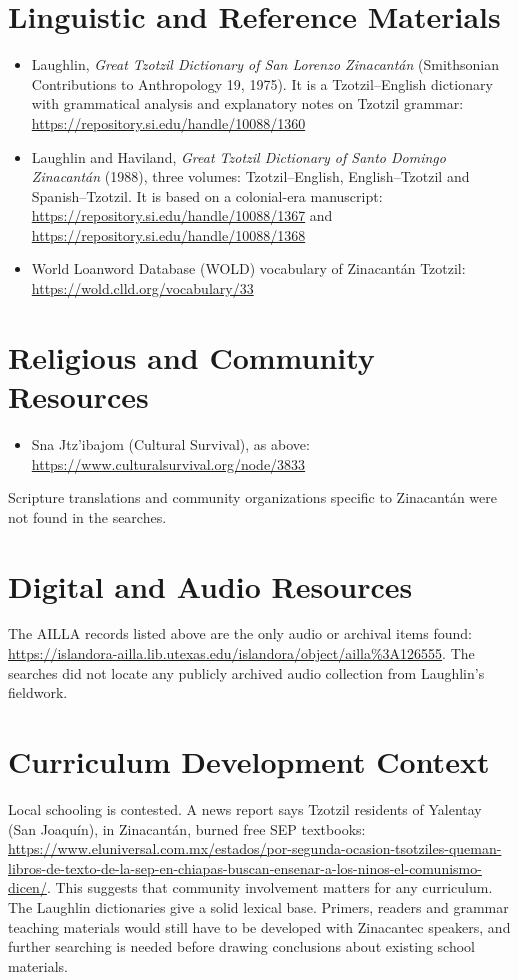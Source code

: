 \documentclass[12pt]{article}
\begin{document}
\section{Linguistic and Reference Materials}
\begin{itemize}
\item Laughlin, \textit{Great Tzotzil Dictionary of San Lorenzo Zinacant\'an} (Smithsonian Contributions to Anthropology 19, 1975). It is a Tzotzil--English dictionary with grammatical analysis and explanatory notes on Tzotzil grammar: \url{https://repository.si.edu/handle/10088/1360}
\item Laughlin and Haviland, \textit{Great Tzotzil Dictionary of Santo Domingo Zinacant\'an} (1988), three volumes: Tzotzil--English, English--Tzotzil and Spanish--Tzotzil. It is based on a colonial-era manuscript: \url{https://repository.si.edu/handle/10088/1367} and \url{https://repository.si.edu/handle/10088/1368}
\item World Loanword Database (WOLD) vocabulary of Zinacant\'an Tzotzil: \url{https://wold.clld.org/vocabulary/33}
\end{itemize}

\section{Religious and Community Resources}
\begin{itemize}
\item Sna Jtz'ibajom (Cultural Survival), as above: \url{https://www.culturalsurvival.org/node/3833}
\end{itemize}
Scripture translations and community organizations specific to Zinacant\'an were not found in the searches.

\section{Digital and Audio Resources}
The AILLA records listed above are the only audio or archival items found: \url{https://islandora-ailla.lib.utexas.edu/islandora/object/ailla%3A126555}. The searches did not locate any publicly archived audio collection from Laughlin's fieldwork.

\section{Curriculum Development Context}
Local schooling is contested. A news report says Tzotzil residents of Yalentay (San Joaqu\'in), in Zinacant\'an, burned free SEP textbooks: \url{https://www.eluniversal.com.mx/estados/por-segunda-ocasion-tsotziles-queman-libros-de-texto-de-la-sep-en-chiapas-buscan-ensenar-a-los-ninos-el-comunismo-dicen/}. This suggests that community involvement matters for any curriculum. The Laughlin dictionaries give a solid lexical base. Primers, readers and grammar teaching materials would still have to be developed with Zinacantec speakers, and further searching is needed before drawing conclusions about existing school materials.
\end{document}
